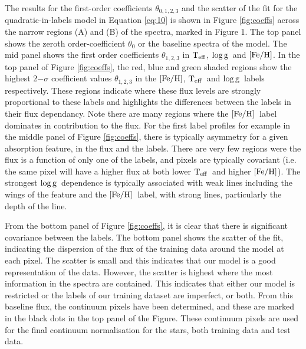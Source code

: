 \documentclass[12pt, preprint]{aastex}
\newcommand{\teff}{\mbox{$\rm T_{eff}$}}
\newcommand{\feh}{\mbox{$\rm [Fe/H]$}}
\newcommand{\logg}{\mbox{$\rm \log g$}}
\begin{document}
The results for the first-order coefficients $\theta_{0,1,2,3}$ and the scatter of the fit for the quadratic-in-labels model in Equation \ref{eq:10} is shown in Figure \ref{fig:coeffs} across the narrow regions (A) and (B) of the spectra, marked in Figure 1. The top panel shows the zeroth order-coefficient $\theta_0$ or the baseline spectra of the model. The mid panel shows the first order coefficients $\theta_{1,2,3}$ in \teff, \logg\ and \feh. In the top panel of Figure \ref{fig:coeffs}, the red, blue and green shaded regions show the highest 2$-\sigma$ coefficient values $\theta_{1,2,3}$ in the \feh, \teff\ and \logg\ labels respectively. These regions indicate where these flux levels are strongly proportional to these labels and highlights the differences between the labels in their flux dependancy. Note there are many regions where the \feh\ label dominates in contribution to the flux. For the first label profiles for example in the middle panel of Figure \ref{fig:coeffs}, there is typically asymmetry for a given absorption feature, in the flux and the labels. There are very few regions were the flux is a function of only one of the labels, and pixels are typically covariant (i.e. the same pixel will have a higher flux at both lower \teff\ and higher \feh). The strongest \logg\ dependence is typically associated with weak lines including the wings of the feature and the \feh\ label, with strong lines, particularly the depth of the line. 

From the bottom panel of Figure \ref{fig:coeffs}, it is clear that there is significant covariance between the labels. The bottom panel shows the scatter of the fit, indicating the dispersion of the flux of the training data around the model at each pixel. The scatter is small and this indicates that our model is a good representation of the data. However, the scatter is highest where the most information in the spectra are contained. This indicates that either our model is restricted or the labels of our training dataset are imperfect, or both. From this baseline flux, the continuum pixels have been determined, and these are marked in the black dots in the top panel of the Figure. These continuum pixels are used for the final continuum normalisation for the stars, both training data and test data. 

\end{document}
